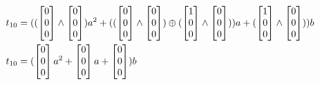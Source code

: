 \begin{equation*}
    \begin{split}
        t_{10} &= ((\begin{bmatrix} 0\\ 0\\ 0 \end{bmatrix} \wedge \begin{bmatrix} 0\\ 0\\ 0 \end{bmatrix})a^2 + ((\begin{bmatrix} 0\\ 0\\ 0 \end{bmatrix} \wedge \begin{bmatrix} 0\\ 0\\ 0 \end{bmatrix}) \xor (\begin{bmatrix} 1\\ 0\\ 0 \end{bmatrix} \wedge \begin{bmatrix} 0\\ 0\\ 0 \end{bmatrix}))a + (\begin{bmatrix} 1\\ 0\\ 0 \end{bmatrix} \wedge \begin{bmatrix} 0\\ 0\\ 0 \end{bmatrix}))b\\
        t_{10} &= (\begin{bmatrix} 0\\ 0\\ 0 \end{bmatrix}a^2 + \begin{bmatrix} 0\\ 0\\ 0 \end{bmatrix}a + \begin{bmatrix} 0\\ 0\\ 0 \end{bmatrix})b\\

\end{split}
\end{equation*}
